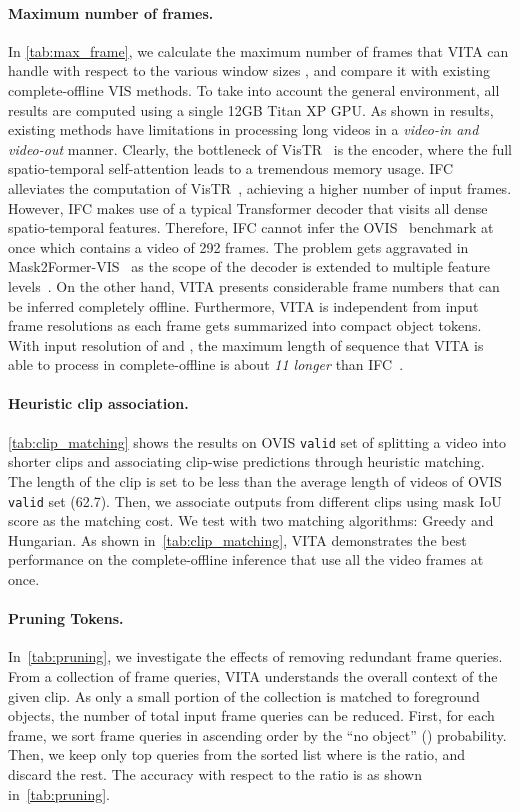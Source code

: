 \documentclass{article}
\begin{document}
\paragraph{Maximum number of frames.}
In \cref{tab:max_frame}, we calculate the maximum number of frames that VITA can handle with respect to the various window sizes , and compare it with existing complete-offline VIS methods.
To take into account the general environment, all results are computed using a single 12GB Titan XP GPU.
As shown in results, existing methods have limitations in processing long videos in a \emph{video-in and video-out} manner.
Clearly, the bottleneck of VisTR~\cite{VisTR} is the encoder, where the full spatio-temporal self-attention leads to a tremendous memory usage.
IFC~\cite{IFC} alleviates the computation of VisTR~\cite{VisTR}, achieving a higher number of input frames.
However, IFC makes use of a typical Transformer decoder that visits all dense spatio-temporal features.
Therefore, IFC cannot infer the OVIS~\cite{OVIS-Dataset} benchmark at once which contains a video of 292 frames.
The problem gets aggravated in Mask2Former-VIS~\cite{Mask2Former-VIS} as the scope of the decoder is extended to multiple feature levels~\cite{Mask2Former}.
On the other hand, VITA presents considerable frame numbers that can be inferred completely offline.
Furthermore, VITA is independent from input frame resolutions as each frame gets summarized into compact object tokens.
With input resolution of  and , the maximum length of sequence that VITA is able to process in complete-offline is about \emph{11 longer} than IFC~\cite{IFC}.

\paragraph{Heuristic clip association.}
\cref{tab:clip_matching} shows the results on OVIS \texttt{valid} set of splitting a video into shorter clips and associating clip-wise predictions through heuristic matching.
The length of the clip is set to be less than the average length of videos of OVIS \texttt{valid} set (62.7).
Then, we associate outputs from different clips using mask IoU score as the matching cost. 
We test with two matching algorithms: Greedy and Hungarian. 
As shown in~\cref{tab:clip_matching}, VITA demonstrates the best performance on the complete-offline inference that use all the video frames at once.

\paragraph{Pruning Tokens.}
In~\cref{tab:pruning}, we investigate the effects of removing redundant frame queries.
From a collection of frame queries, VITA understands the overall context of the given clip.
As only a small portion of the collection is matched to foreground objects, the number of total input frame queries can be reduced.
First, for each frame, we sort frame queries in ascending order by the ``no object'' () probability.
Then, we keep only top  queries from the sorted list where  is the ratio, and discard the rest.
The accuracy with respect to the ratio  is as shown in~\cref{tab:pruning}.
\end{document}
